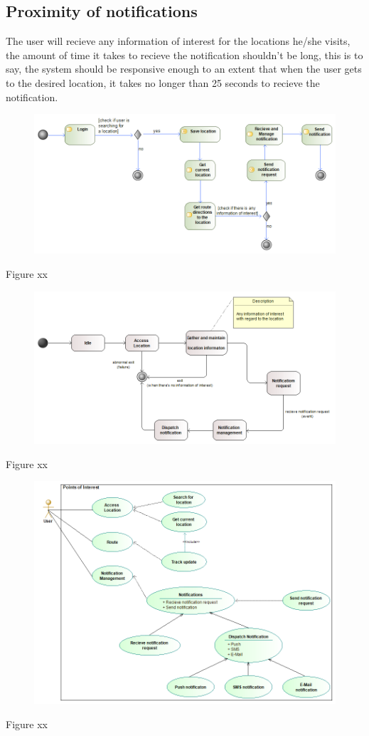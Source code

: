 \documentclass[a4paper, 12pt]{article}
\begin{document}
	\subsection{Proximity of notifications}
	The user will recieve any information of interest for the locations he/she visits, the amount
	of time it takes to recieve the notification shouldn't be long, this is to say, the system should 
	be responsive enough to an extent that when the user gets to the desired location, it takes no longer 
	than 25 seconds to recieve the notification.
	
	\begin{figure}[H]\includegraphics[width=\textwidth]{POI - Activity diagram}\end{figure}
		\begin{center}Figure xx\end{center}
	\begin{figure}[H]\includegraphics[width=\textwidth]{POI - State Machine diagram}\end{figure}
		\begin{center}Figure xx\end{center}
	\begin{figure}[H]\includegraphics[width=\textwidth]{POI - Use Case diagram}\end{figure}
		\begin{center}Figure xx\end{center}
\end{document}
